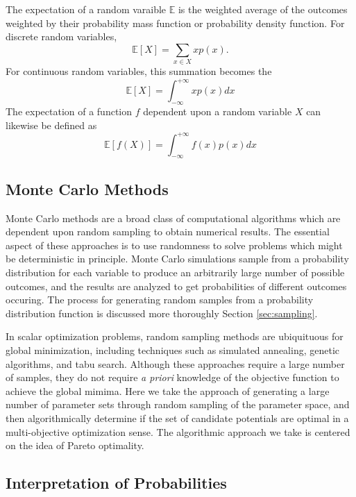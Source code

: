  The expectation of a random varaible $\mathbb{E}$ is the weighted average of the outcomes weighted by their probability mass function or probability density function.  For discrete random variables,
 \begin{equation}
	 \mathbb{E}[X] = \sum_{x\in X} x p(x).
	\end{equation}
For continuous random variables, this summation becomes the
\begin{equation}
	\mathbb{E}[X] = \int_{-\infty}^{+\infty} x p(x) dx
\end{equation}
The expectation of a function $f$ dependent upon a random variable $X$ can likewise be defined as
\begin{equation}
	\mathbb{E}[f(X)] = \int_{-\infty}^{+\infty} f(x) p(x) dx
\end{equation}
\subsection{Monte Carlo Methods}
Monte Carlo methods\cite{thomopoulos2013_montecarlo} are a broad class of computational algorithms which are dependent upon random sampling to obtain numerical results.
The essential aspect of these approaches is to use randomness to solve problems which might be deterministic in principle.
Monte Carlo simulations sample from a probability distribution for each variable to produce an arbitrarily large number of possible outcomes, and  the results are analyzed to get probabilities of different outcomes occuring.  The process for generating random samples from a probability distribution function is discussed more thoroughly Section \ref{sec:sampling}.

In scalar optimization problems, random sampling methods are ubiquituous for global minimization, including techniques such as simulated annealing\cite{kirkpatrick1983_simmulated_annealing}, genetic algorithms\cite{holland1975_ga}, and tabu search\cite{glover1986_tabu}.  Although these approaches require a large number of samples, they do not require \emph{a priori} knowledge of the objective function to achieve the global mimima.
Here we take the approach of generating a large number of parameter sets through random sampling of the parameter space, and then algorithmically determine if the set of candidate potentials are optimal in a multi-objective optimization sense.  The algorithmic approach we take is centered on the idea of Pareto optimality.

\subsection{Interpretation of Probabilities}

